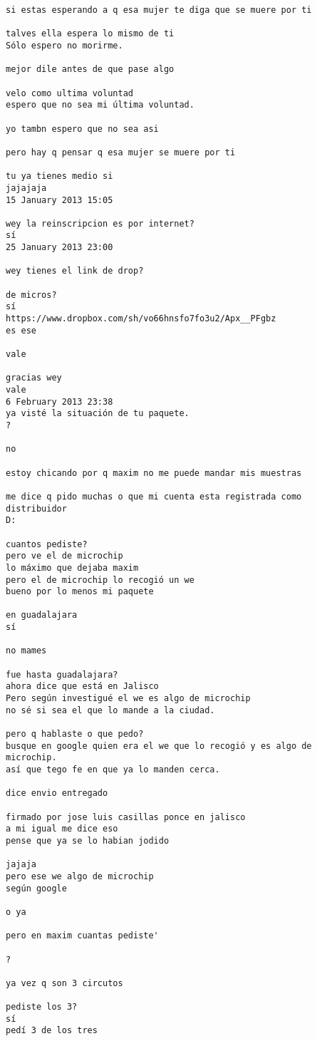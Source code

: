 \begin{verbatim}
si estas esperando a q esa mujer te diga que se muere por ti

talves ella espera lo mismo de ti
Sólo espero no morirme.

mejor dile antes de que pase algo

velo como ultima voluntad
espero que no sea mi última voluntad.

yo tambn espero que no sea asi

pero hay q pensar q esa mujer se muere por ti

tu ya tienes medio si
jajajaja
15 January 2013 15:05

wey la reinscripcion es por internet?
sí
25 January 2013 23:00

wey tienes el link de drop?

de micros?
sí
https://www.dropbox.com/sh/vo66hnsfo7fo3u2/Apx__PFgbz
es ese

vale

gracias wey
vale
6 February 2013 23:38
ya visté la situación de tu paquete.
?

no

estoy chicando por q maxim no me puede mandar mis muestras

me dice q pido muchas o que mi cuenta esta registrada como distribuidor
D:

cuantos pediste?
pero ve el de microchip
lo máximo que dejaba maxim
pero el de microchip lo recogió un we
bueno por lo menos mi paquete

en guadalajara
sí

no mames

fue hasta guadalajara?
ahora dice que está en Jalisco
Pero según investigué el we es algo de microchip
no sé si sea el que lo mande a la ciudad.

pero q hablaste o que pedo?
busque en google quien era el we que lo recogió y es algo de microchip.
así que tego fe en que ya lo manden cerca.

dice envio entregado

firmado por jose luis casillas ponce en jalisco
a mi igual me dice eso
pense que ya se lo habian jodido

jajaja
pero ese we algo de microchip
según google

o ya

pero en maxim cuantas pediste'

?

ya vez q son 3 circutos

pediste los 3?
sí
pedí 3 de los tres


\end{verbatim}
